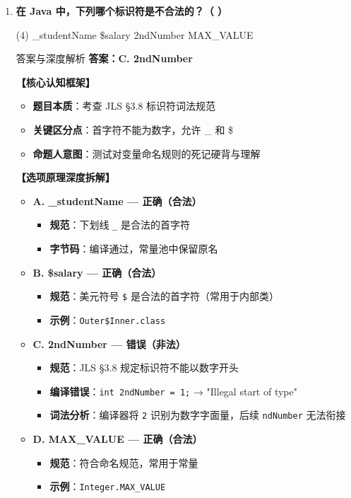 ﻿\documentclass[12pt, a4paper]{ctexart}
\newcommand{\code}[1]{\texttt{#1}}
\begin{document}
\begin{enumerate}[label=\textbf{\arabic*.}, leftmargin=*, itemsep=1.5em]
	\item \textbf{在 Java 中，下列哪个标识符是不合法的？（ \quad ）}
	      \begin{tasks}(4)
		      \task \_studentName \task \$salary \task 2ndNumber \task MAX\_VALUE
	      \end{tasks}
	      \begin{bluebox}{答案与深度解析}
		      \textbf{答案：C. 2ndNumber}

		      \textbf{【核心认知框架】}
		      \begin{itemize}[leftmargin=*, nosep]
			      \item \textbf{题目本质}：考查 JLS §3.8 标识符词法规范
			      \item \textbf{关键区分点}：首字符不能为数字，允许 \_ 和 \$
			      \item \textbf{命题人意图}：测试对变量命名规则的死记硬背与理解
		      \end{itemize}

		      \textbf{【选项原理深度拆解】}
		      \begin{itemize}[leftmargin=*, nosep]
			      \item \textbf{A. \_studentName — 正确（合法）}
			            \begin{itemize}[leftmargin=*, nosep]
				            \item \textbf{规范}：下划线 \code{\_} 是合法的首字符
				            \item \textbf{字节码}：编译通过，常量池中保留原名
			            \end{itemize}
			      \item \textbf{B. \$salary — 正确（合法）}
			            \begin{itemize}[leftmargin=*, nosep]
				            \item \textbf{规范}：美元符号 \code{\$} 是合法的首字符（常用于内部类）
				            \item \textbf{示例}：\code{Outer\$Inner.class}
			            \end{itemize}
			      \item \textbf{C. 2ndNumber — 错误（非法）}
			            \begin{itemize}[leftmargin=*, nosep]
				            \item \textbf{规范}：JLS §3.8 规定标识符不能以数字开头
				            \item \textbf{编译错误}：\code{int 2ndNumber = 1;} → "Illegal start of type"
				            \item \textbf{词法分析}：编译器将 \code{2} 识别为数字字面量，后续 \code{ndNumber} 无法衔接
			            \end{itemize}
			      \item \textbf{D. MAX\_VALUE — 正确（合法）}
			            \begin{itemize}[leftmargin=*, nosep]
				            \item \textbf{规范}：符合命名规范，常用于常量
				            \item \textbf{示例}：\code{Integer.MAX\_VALUE}
			            \end{itemize}
		      \end{itemize}


\end{bluebox}
\end{enumerate}
\end{document}
